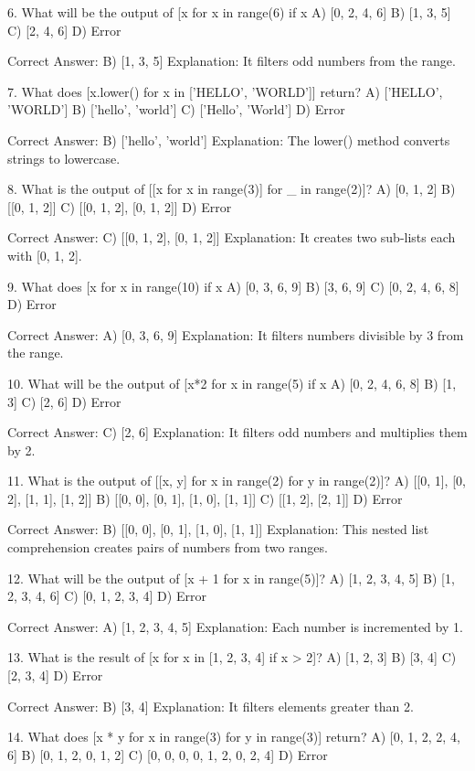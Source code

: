 6. What will be the output of [x for x in range(6) if x %
A) [0, 2, 4, 6]
B) [1, 3, 5]
C) [2, 4, 6]
D) Error

Correct Answer: B) [1, 3, 5]
Explanation: It filters odd numbers from the range.

7. What does [x.lower() for x in ['HELLO', 'WORLD']] return?
A) ['HELLO', 'WORLD']
B) ['hello', 'world']
C) ['Hello', 'World']
D) Error

Correct Answer: B) ['hello', 'world']
Explanation: The lower() method converts strings to lowercase.

8. What is the output of [[x for x in range(3)] for _ in range(2)]?
A) [0, 1, 2]
B) [[0, 1, 2]]
C) [[0, 1, 2], [0, 1, 2]]
D) Error

Correct Answer: C) [[0, 1, 2], [0, 1, 2]]
Explanation: It creates two sub-lists each with [0, 1, 2].

9. What does [x for x in range(10) if x %
A) [0, 3, 6, 9]
B) [3, 6, 9]
C) [0, 2, 4, 6, 8]
D) Error

Correct Answer: A) [0, 3, 6, 9]
Explanation: It filters numbers divisible by 3 from the range.

10. What will be the output of [x*2 for x in range(5) if x %
A) [0, 2, 4, 6, 8]
B) [1, 3]
C) [2, 6]
D) Error

Correct Answer: C) [2, 6]
Explanation: It filters odd numbers and multiplies them by 2.

11. What is the output of [[x, y] for x in range(2) for y in range(2)]?
A) [[0, 1], [0, 2], [1, 1], [1, 2]]
B) [[0, 0], [0, 1], [1, 0], [1, 1]]
C) [[1, 2], [2, 1]]
D) Error

Correct Answer: B) [[0, 0], [0, 1], [1, 0], [1, 1]]
Explanation: This nested list comprehension creates pairs of numbers from two ranges.

12. What will be the output of [x + 1 for x in range(5)]?
A) [1, 2, 3, 4, 5]
B) [1, 2, 3, 4, 6]
C) [0, 1, 2, 3, 4]
D) Error

Correct Answer: A) [1, 2, 3, 4, 5]
Explanation: Each number is incremented by 1.

13. What is the result of [x for x in [1, 2, 3, 4] if x > 2]?
A) [1, 2, 3]
B) [3, 4]
C) [2, 3, 4]
D) Error

Correct Answer: B) [3, 4]
Explanation: It filters elements greater than 2.

14. What does [x * y for x in range(3) for y in range(3)] return?
A) [0, 1, 2, 2, 4, 6]
B) [0, 1, 2, 0, 1, 2]
C) [0, 0, 0, 0, 1, 2, 0, 2, 4]
D) Error

